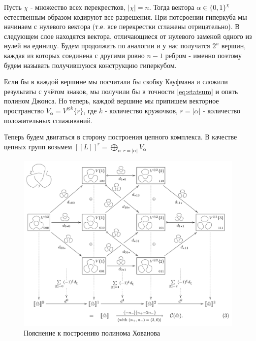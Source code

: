 \documentclass[a4paper,8pt]{extarticle}
\begin{document}
\begin{multicols}{2}
    Пусть $\chi$ - множество всех перекрестков, $|\chi| = n$. Тогда вектора $\alpha \in
    \{0,1\}^\chi$ естественным образом кодируют все разрешения. При
    потсроении гиперкуба мы начинаем с нулевого вектора (т.е. все
    перекрестки сглажены отрицательно). В следующем слое находятся
    вектора, отличающиеся от нулевого заменой одного из нулей на
    единицу. Будем продолжать по аналогии и у нас получатся $2^n$
    вершин, каждая из которых соединена с другими ровно $n-1$ ребром - 
    именно поэтому будем называть получившуюся конструкцию гиперкубом.

    Если бы в каждой вершине мы посчитали бы скобку Кауфмана
    и сложили результаты с учётом знаков, мы получили бы в точности
    \eqref{eq:statsum} и опять полином Джонса. Но теперь, каждой
    вершине мы припишем векторное пространство $V_\alpha = V^{\otimes k}\{r\}$,
    где $k$ - количество кружочков, $r=|\alpha|$ - количество положительных
    сглаживаний.

    Теперь будем двигаться в сторону построения цепного комплекса.
    В качестве цепных групп возьмем $[\![ L ]\!]^r = \bigoplus_{\alpha: r=|\alpha|} V_\alpha$


    \columnbreak
\end{multicols}

\begin{figure}[h]
  \centering
  \includegraphics[width=0.8\linewidth]{../img/bar-natan-2.png}
  \caption{Пояснение к построению полинома Хованова \parencite{bar-natan}}
  \label{fig:bar-natan-2}
\end{figure}

\printbibliography
\end{document}
